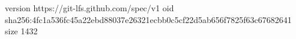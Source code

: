 version https://git-lfs.github.com/spec/v1
oid sha256:4fc1a536fc45a22ebd88037e26321ecbb0c5cf22d5ab656f7825f63c67682641
size 1432
